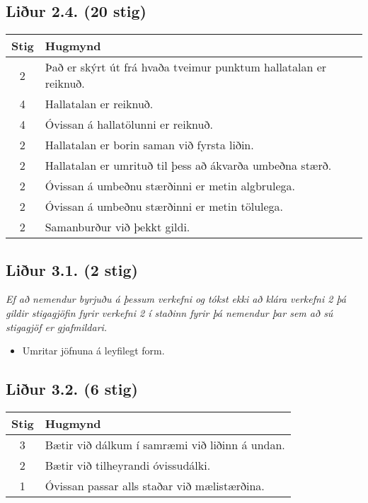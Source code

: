 \begin{tcolorbox}

\subsection*{Liður 2.4. (20 stig)}

\begin{table}[H]
    \centering
    \begin{tabular}{|c|l|}
    \hline
       \textbf{Stig}  & \textbf{Hugmynd}   \\ \hline \hline
        2  & Það er skýrt út frá hvaða tveimur punktum hallatalan er reiknuð. \\ \hline
        4  & Hallatalan er reiknuð. \\ \hline
        4  & Óvissan á hallatölunni er reiknuð. \\ \hline
        2  & Hallatalan er borin saman við fyrsta liðin. \\ \hline
        2  & Hallatalan er umrituð til þess að ákvarða umbeðna stærð.  \\ \hline
        2  & Óvissan á umbeðnu stærðinni er metin algbrulega.  \\ \hline
        2  & Óvissan á umbeðnu stærðinni er metin tölulega.  \\ \hline
        2  & Samanburður við þekkt gildi.  \\ \hline
    \end{tabular}
\end{table}

\subsection*{Liður 3.1. (2 stig)}

\textit{Ef að nemendur byrjuðu á þessum verkefni og tókst ekki að klára verkefni 2 þá gildir stigagjöfin fyrir verkefni 2 í staðinn fyrir þá nemendur þar sem að sú stigagjöf er gjafmildari.}

\begin{itemize}
    \item Umritar jöfnuna á leyfilegt form.
\end{itemize}

\subsection*{Liður 3.2. (6 stig)}

\begin{table}[H]
    \centering
    \begin{tabular}{|c|l|}
    \hline
       \textbf{Stig}  & \textbf{Hugmynd}   \\ \hline \hline
        3  & Bætir við dálkum í samræmi við liðinn á undan. \\ \hline
        2  & Bætir við tilheyrandi óvissudálki.  \\ \hline
        1  & Óvissan passar alls staðar við mælistærðina. \\ \hline
    \end{tabular}
\end{table}


\end{tcolorbox}
